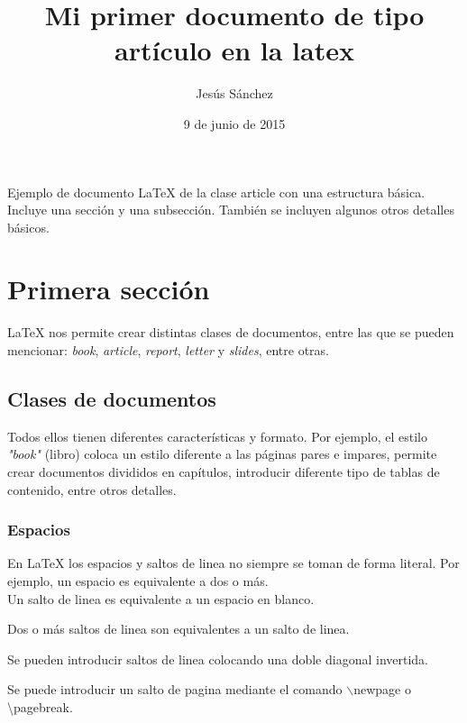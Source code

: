 \documentclass[letterpaper,12pt]{article}
\title{Mi primer documento de tipo artículo en la latex}
\author{Jesús Sánchez}
\date{9 de junio de 2015}
\begin{document}
\maketitle

\tableofcontents

\pagebreak

Ejemplo de documento LaTeX de la clase {\ttfamily article} con una estructura básica. 
Incluye una sección y una subsección. También se incluyen algunos otros  
detalles básicos.

\section{Primera sección}

LaTeX nos permite crear distintas clases de documentos, entre las que se pueden mencionar: 
\textit{book}, \textit{article}, \textit{report}, \textit{letter} y \textit{slides}, entre otras.

\subsection{Clases de documentos}
Todos ellos tienen diferentes características y formato. Por ejemplo, el estilo \textit{"book"} 
(libro) coloca un estilo diferente a las páginas pares e impares, permite crear documentos 
divididos en capítulos, introducir diferente  tipo de tablas de contenido, entre otros detalles.



\subsubsection{Espacios}
En LaTeX los espacios y saltos de linea no siempre se toman de forma literal.
Por ejemplo, un espacio        es      equivalente a      dos o más.\\
Un salto de linea es equivalente a un espacio en blanco.



Dos o más saltos de linea son equivalentes a un salto de linea.

Se pueden introducir saltos de linea colocando una doble diagonal invertida.

Se puede introducir un salto de pagina mediante el comando $\backslash$newpage o \textbackslash pagebreak.
\end{document}
